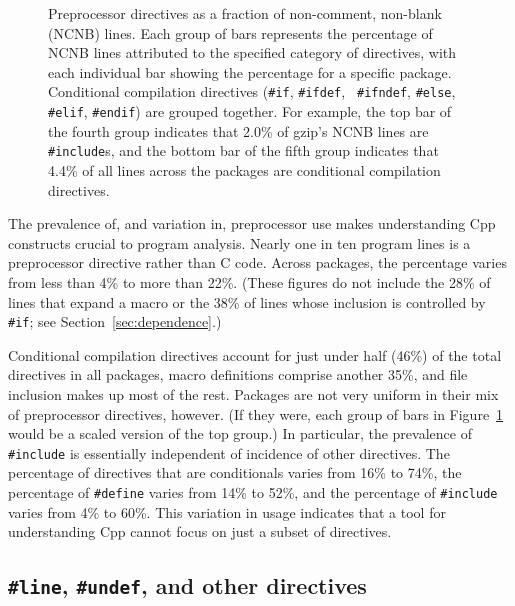 \documentclass[10pt]{article}
\newcommand{\captionsmall}[1]{\caption[]{\small #1}}
\begin{document}
\begin{figure}
\centerline{}
\captionsmall{Preprocessor directives as a fraction of non-comment,
  non-blank (NCNB) lines.  Each group of bars represents the percentage of
  NCNB lines attributed to the specified category of directives, with each
  individual bar showing the percentage for a specific package.
  Conditional compilation directives ({\tt \#if}, {\tt \#ifdef}, {\tt
  \#ifndef}, {\tt \#else}, {\tt \#elif}, {\tt \#endif}) are grouped
  together.  For example, the top bar of the fourth group indicates that
  2.0\% of gzip's NCNB lines are {\tt \#include}s, and the bottom bar of the
  fifth group indicates that 4.4\% of all lines across the packages are
  conditional compilation directives.}
\label{fig:directives-breakdown}
\end{figure}

The prevalence of, and variation in, preprocessor use makes understanding
Cpp constructs crucial to program analysis.  Nearly one in ten program
lines is a 
preprocessor directive rather than C code.  Across packages, the percentage
varies from less than 4\% to more than 22\%.  (These figures do not include
the 28\% of lines that expand a macro or the 38\% of lines whose inclusion
is controlled by {\tt \#if}; see Section~\ref{sec:dependence}.)


Conditional compilation directives account for just under half (46\%) of
the total directives in all packages, macro definitions comprise another
35\%, and file inclusion makes up most of the rest.  Packages are not very
uniform in their mix of preprocessor directives, however.  (If they were,
each group of bars in Figure~\ref{fig:directives-breakdown} would be
a scaled version of the top group.)  In particular, the prevalence of {\tt
\#include} is essentially independent of incidence of other directives.
The percentage of directives that are conditionals varies from 16\% to
74\%, the percentage of {\tt \#define} varies from 14\% to 52\%, and the
percentage of {\tt \#include} varies from 4\% to 60\%.  This variation in
usage indicates that a tool for understanding Cpp cannot focus on just a
subset of directives.


\subsection{{\tt \#line}, {\tt \#undef}, and other directives}
\end{document}
